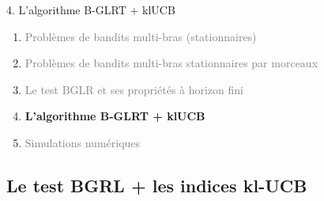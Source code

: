 \documentclass[11pt,french,ignorenonframetext,]{beamer}
\begin{document}
\begin{frame}{4. L'algorithme B-GLRT + klUCB}

  \begin{enumerate}
    \item
    \textcolor{gray}{
      Problèmes de bandits multi-bras (stationnaires)
    }
    \vspace*{15pt}

    \item
    \textcolor{gray}{
      Problèmes de bandits multi-bras stationnaires par morceaux
    }
    \vspace*{15pt}

    \item
    \textcolor{gray}{
      Le test BGLR et ses propriétés à horizon fini
    }
    \vspace*{15pt}

    \item
    \alert{\textbf{%
      L'algorithme B-GLRT + klUCB
    }}
    \vspace*{15pt}


    \item
    \textcolor{gray}{
      Simulations numériques
    }
  \end{enumerate}

\end{frame}

\subsection{\hfill{}Le test BGRL + les indices kl-UCB\hfill{}}
\end{document}
